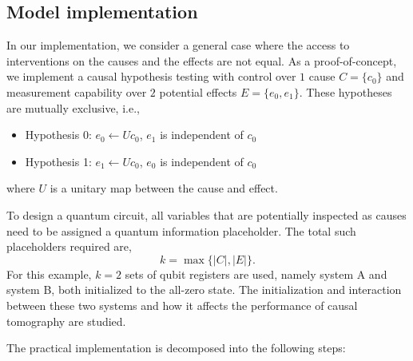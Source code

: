 \documentclass[%
 aps,
 jmp,%
 amsmath,amssymb,
 reprint,%
]{revtex4-2}
\begin{document}
\subsection{Model implementation}
In our implementation, we consider a general case where the access to interventions on the causes and the effects are not equal.
As a proof-of-concept, we implement a causal hypothesis testing with control over $1$ cause $C=\{c_0\}$ and measurement capability over $2$ potential effects $E = \{e_0,e_1\}$.
These hypotheses are mutually exclusive, i.e., 
\begin{itemize}
    \item Hypothesis 0: $e_0 \leftarrow U c_0$, $e_1$ is independent of $c_0$
    \item Hypothesis 1: $e_1 \leftarrow U c_0$, $e_0$ is independent of $c_0$
\end{itemize}
where $U$ is a unitary map between the cause and effect.
    
To design a quantum circuit, all variables that are potentially inspected as causes need to be assigned a quantum information placeholder.
The total such placeholders required are, 
\begin{equation}
k = \max\{|C|,|E|\}.
\end{equation}
For this example, $k=2$ sets of qubit registers are used, namely system A and system B, both initialized to the all-zero state.
The initialization and interaction between these two systems and how it affects the performance of causal tomography are studied.

The practical implementation is decomposed into the following steps:
\end{document}
